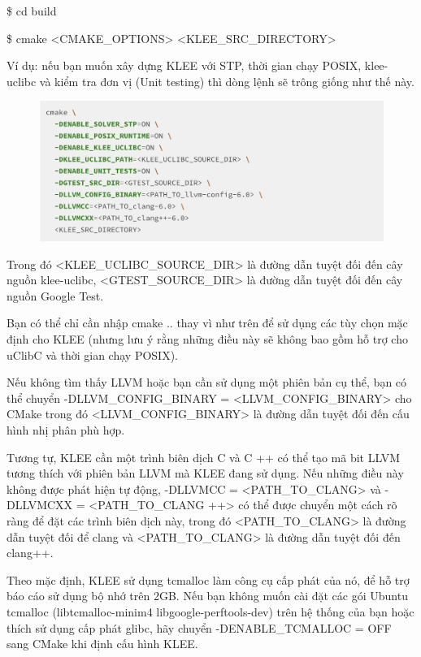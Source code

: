 \documentclass[12pt,a4paper]{article}
\begin{document}
\$ cd build

\$ cmake <CMAKE\_OPTIONS> <KLEE\_SRC\_DIRECTORY>

Ví dụ: nếu bạn muốn xây dựng KLEE với STP, thời gian chạy POSIX, klee-uclibc và kiểm tra đơn vị (Unit testing) thì dòng lệnh sẽ trông giống như thế này.

\begin{figure}[ht]
\begin{center}
\includegraphics[scale=.3]{hinhanh/cmakeklee.png}
\end{center}
\end{figure}

Trong đó <KLEE\_UCLIBC\_SOURCE\_DIR> là đường dẫn tuyệt đối đến cây nguồn klee-uclibc, <GTEST\_SOURCE\_DIR> là đường dẫn tuyệt đối đến cây nguồn Google Test.

Bạn có thể chỉ cần nhập cmake .. thay vì như trên để sử dụng các tùy chọn mặc định cho KLEE (nhưng lưu ý rằng những điều này sẽ không bao gồm hỗ trợ cho uClibC và thời gian chạy POSIX).

Nếu không tìm thấy LLVM hoặc bạn cần sử dụng một phiên bản cụ thể, bạn có thể chuyển -DLLVM\_CONFIG\_BINARY = <LLVM\_CONFIG\_BINARY> cho CMake trong đó <LLVM\_CONFIG\_BINARY> là đường dẫn tuyệt đối đến cấu hình nhị phân phù hợp.

Tương tự, KLEE cần một trình biên dịch C và C ++ có thể tạo mã bit LLVM tương thích với phiên bản LLVM mà KLEE đang sử dụng. Nếu những điều này không được phát hiện tự động, -DLLVMCC = <PATH\_TO\_CLANG> và -DLLVMCXX = <PATH\_TO\_CLANG ++> có thể được chuyển một cách rõ ràng để đặt các trình biên dịch này, trong đó <PATH\_TO\_CLANG> là đường dẫn tuyệt đối để clang và <PATH\_TO\_CLANG> là đường dẫn tuyệt đối đến clang++.

Theo mặc định, KLEE sử dụng tcmalloc làm công cụ cấp phát của nó, để hỗ trợ báo cáo sử dụng bộ nhớ trên 2GB. Nếu bạn không muốn cài đặt các gói Ubuntu tcmalloc (libtcmalloc-minim4 libgoogle-perftools-dev) trên hệ thống của bạn hoặc thích sử dụng cấp phát glibc, hãy chuyển -DENABLE\_TCMALLOC = OFF sang CMake khi định cấu hình KLEE.
\end{document}
